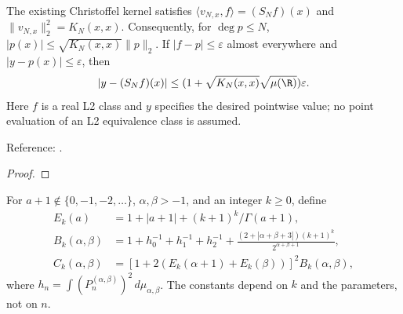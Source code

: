 \begin{theorem}
\label{thm:kernel-evaluation-bound}
\leanok
The existing Christoffel kernel satisfies
$\langle v_{N,x},f\rangle=(S_Nf)(x)$ and $\|v_{N,x}\|_2^2=K_N(x,x)$.
Consequently, for $\deg p\le N$,
$|p(x)|\le\sqrt{K_N(x,x)}\|p\|_2$.
If $|f-p|\le\varepsilon$ almost everywhere and $|y-p(x)|\le\varepsilon$, then
\[ |y-(S_Nf)(x)|\le
 (1+\sqrt{K_N(x,x)}\sqrt{\mu(\R)})\varepsilon. \]
Here $f$ is a real L2 class and $y$ specifies the desired pointwise value;
no point evaluation of an L2 equivalence class is assumed.

Reference: \cite[18.2(v), (viii)]{dlmf}.
\end{theorem}
\begin{proof}
\leanok
\end{proof}

\begin{definition}
\label{def:jacobi-growth-constants}
\leanok
For $a+1\notin\{0,-1,-2,\ldots\}$, $\alpha,\beta>-1$, and an integer
$k\ge0$, define
\begin{align*}
 E_k(a)&=1+|a+1|+(k+1)^k/\Gamma(a+1),\\
 B_k(\alpha,\beta)&=1+h_0^{-1}+h_1^{-1}+h_2^{-1}
 +\frac{(2+|\alpha+\beta+3|)(k+1)^k}{2^{\alpha+\beta+1}},\\
 C_k(\alpha,\beta)&=[1+2(E_k(\alpha+1)+E_k(\beta))]^2B_k(\alpha,\beta),
\end{align*}
where $h_n=\int(P_n^{(\alpha,\beta)})^2\,d\mu_{\alpha,\beta}$.
The constants depend on $k$ and the parameters, not on $n$.
\end{definition}

